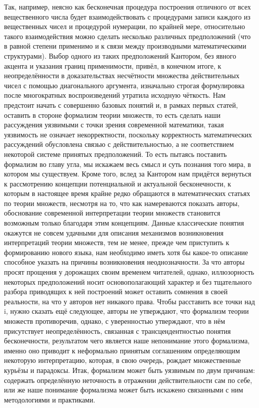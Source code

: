 \documentclass[12pt]{article}
\begin{document}
Так, например, неясно как бесконечная процедура построения отличного от всех вещественного числа будет взаимодействовать с процедурами записи каждого из вещественных чисел и процедурой нумерации, по крайней мере, относительно такого взаимодействия можно сделать несколько различных предположений (что в равной степени применимо и к связи между производными математическими структурами). Выбор одного из таких предположений Кантором, без явного акцента и указания границ применимости, привёл, в конечном итоге, к неопределённости в доказательствах несчётности множества действительных чисел с помощью диагонального аргумента, изначально строгая формулировка после многократных воспроизведений утратила исходную чёткость. Нам предстоит начать с совершенно базовых понятий и, в рамках первых статей, оставить в стороне формализм теории множеств, то есть сделать наши рассуждения уязвимыми с точки зрения современной математики, такая уязвимость не означает некорректности, поскольку корректность математических рассуждений обусловлена связью с действительностью, а не соответствием некоторой системе принятых предположений. То есть пытаясь поставить формализм во главу угла, мы искажаем весь смысл и суть познания того мира, в котором мы существуем. Кроме того, вслед за Кантором нам придётся вернуться к рассмотрению концепции потенциальной и актуальной бесконечности, к которым в настоящее время крайне редко обращаются в математических статьях по теории множеств, несмотря на то, что как намереваются показать авторы, обоснование современной интерпретации теории множеств становится возможным только благодаря этим концепциям. Данные классические понятия окажутся не совсем удачными для описания механизмов возникновения интерпретаций теории множеств, тем не менее, прежде чем приступить к формированию нового языка, нам необходимо иметь хотя бы какое-то описание способное указать на причины возникновения неоднозначности. За что авторы просят прощения у дорожащих своим временем читателей, однако, иллюзорность некоторых предположений носит основополагающий характер и без тщательного разбора приводящих к ней построений может оставить сомнения в своей реальности, на что у авторов нет никакого права. Чтобы расставить все точки над i, нужно сказать ещё следующее, авторы не утверждают, что формализм теории множеств противоречив, однако, с уверенностью утверждают, что в нём присутствует неопределённость, связанная с трансцендентностью понятия бесконечности, результатом чего является наше непонимание этого формализма, именно оно приводит к неформально принятым соглашениям определяющим некоторую интерпретацию, которая, в свою очередь, рождает множественные курьёзы и парадоксы. Итак, формализм может быть уязвимым по двум причинам: содержать определённую неточность в отражении действительности сам по себе, или же наше понимание формализма может быть искажено связанными с ним методологиями и практиками. 
\end{document}
